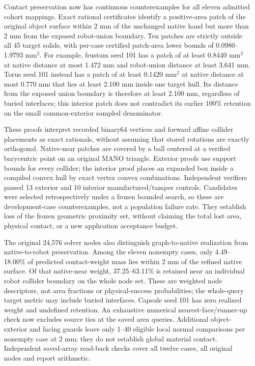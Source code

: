 \documentclass[10pt,letterpaper]{article}
\begin{document}
Contact preservation now has continuous counterexamples for all eleven
admitted cohort mappings. Exact rational certificates identify a positive-area
patch of the original object surface within 2 mm of the unchanged native hand
but more than 2 mm from the exposed robot-union boundary. Ten patches are
strictly outside all 45 target solids, with per-case certified patch-area lower
bounds of 0.0980--1.9793 $\mathrm{mm}^2$. For example, frustum seed 101 has a
patch of at least 0.8440 $\mathrm{mm}^2$ at native distance at most 1.472 mm
and robot-union distance at least 3.641 mm. Torus seed 101 instead has a patch
of at least 0.1420 $\mathrm{mm}^2$ at native distance at most 0.770 mm that lies
at least 2.100 mm inside one target hull. Its distance from the exposed union
boundary is therefore at least 2.100 mm, regardless of buried interfaces;
this interior patch does not contradict its earlier 100\% retention on the
small common-exterior sampled denominator.

These proofs interpret recorded binary64 vertices and forward affine collider
placements as exact rationals, without assuming that stored rotations are
exactly orthogonal. Native-near patches are covered by a ball centered at a
verified barycentric point on an original MANO triangle. Exterior proofs use
support bounds for every collider; the interior proof places an expanded box
inside a compiled convex hull by exact vertex convex combinations. Independent
verifiers passed 13 exterior and 10 interior manufactured/tamper controls.
Candidates were selected retrospectively under a frozen bounded search, so
these are development-case counterexamples, not a population failure rate.
They establish loss of the frozen geometric proximity set, without claiming
the total lost area, physical contact, or a new application acceptance budget.

The original 24,576 solver nodes also distinguish graph-to-native realization
from native-to-robot preservation. Among the eleven nonempty cases, only
4.49--18.00\% of predicted contact-weight mass lies within 2 mm of the refined
native surface. Of that native-near weight, 37.25--63.11\% is retained near an
individual robot collider boundary on the whole node set. These are weighted
node descriptors, not area fractions or physical-success probabilities; the
whole-query target metric may include buried interfaces. Capsule seed 101 has
zero realized weight and undefined retention. An exhaustive numerical
nearest-face/runner-up check now excludes source ties at the saved area queries.
Additional object-exterior and facing guards leave only 1--40 eligible local
normal comparisons per nonempty case at 2 mm; they do not establish global
material contact. Independent saved-array read-back checks cover all twelve
cases, all original nodes and report arithmetic.
\end{document}
